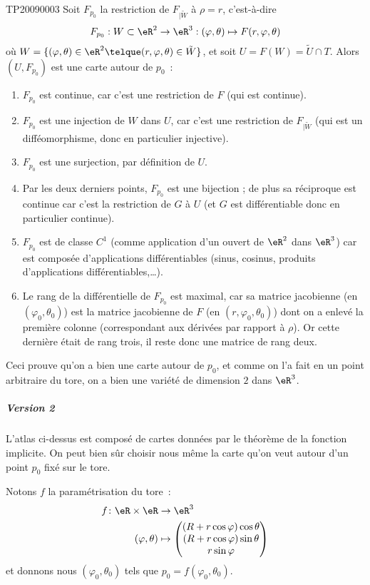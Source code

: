 \begin{corrige}{TP20090003}
Soit $F_{p_0}$ la restriction de $F_{| \tilde W}$ à $\rho = r$, c'est-à-dire
\begin{equation*}
  F_{p_0} : W \subset \eR^2 \to \eR^3 : (\varphi,\theta) \mapsto F(r,\varphi,\theta)
\end{equation*}
où $W = \{ (\varphi,\theta) \in \eR^2 \telque (r,\varphi,\theta) \in \tilde
W\}$, et soit $U = F(W) = \tilde U \cap T$. Alors $(U, F_{p_0})$ est
une carte autour de $p_0$~:
\begin{enumerate}
\item $F_{p_0}$ est continue, car c'est une restriction de $F$ (qui est
  continue).
\item $F_{p_0}$ est une injection de $W$ dans $U$, car c'est une
  restriction de $F_{| \tilde W}$ (qui est un difféomorphisme,
  donc en particulier injective).
\item $F_{p_0}$ est une surjection, par définition de $U$.
\item Par les deux derniers points, $F_{p_0}$ est une bijection ; de
  plus sa réciproque est continue car c'est la restriction de $G$ à
  $U$ (et $G$ est différentiable donc en particulier continue).
\item $F_{p_0}$ est de classe $C^1$ (comme application d'un ouvert de
  $\eR^2$ dans $\eR^3$) car est composée d'applications
  différentiables (sinus, cosinus, produits d'applications
  différentiables,\dots).
\item Le rang de la différentielle de $F_{p_0}$ est maximal, car sa
  matrice jacobienne (en $(\varphi_0,\theta_0)$) est la matrice jacobienne de $F$
  (en $(r,\varphi_0,\theta_0)$) dont on a enlevé la première colonne
  (correspondant aux dérivées par rapport à $\rho$). Or cette dernière
  était de rang trois, il reste donc une matrice de rang deux.
\end{enumerate}

Ceci prouve qu'on a bien une carte autour de $p_0$, et comme on l'a
fait en un point arbitraire du tore, on a bien une variété de
dimension $2$ dans $\eR^3$.

\subparagraph{Version 2} L'atlas ci-dessus est composé de cartes
données par le théorème de la fonction implicite. On peut bien sûr
choisir nous même la carte qu'on veut autour d'un point $p_0$ fixé sur
le tore.

Notons $f$ la paramétrisation du tore~:
\begin{equation}
	\begin{aligned}
		f\colon \eR\times\eR&\to \eR^3 \\
		(\varphi,\theta)&\mapsto \begin{pmatrix}
			(R+r\cos\varphi)\cos\theta	\\ 
			(R+r\cos\varphi)\sin\theta	\\ 
			r\sin\varphi	
		\end{pmatrix}
	\end{aligned}
\end{equation}
et donnons nous $(\varphi_0,\theta_0)$ tels que $p_0 =
f(\varphi_0,\theta_0)$.


\end{corrige}
